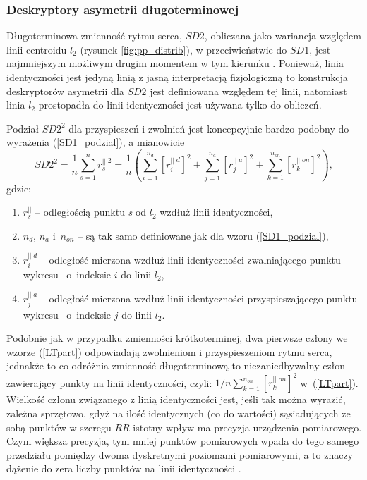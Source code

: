 \subsubsection{Deskryptory asymetrii długoterminowej}

Długoterminowa zmienność rytmu serca, $SD2$, obliczana jako wariancja względem linii
centroidu $l_2$ (rysunek \ref{fig:pp_distrib}), w przeciwieństwie do $SD1$, jest
najmniejszym możliwym drugim momentem w tym kierunku \cite{geomasy,annals,berlinJa}. Ponieważ, linia identyczności jest
jedyną linią z jasną interpretacją fizjologiczną to konstrukcja deskryptorów asymetrii dla
$SD2$ jest definiowana względem tej linii, natomiast linia $l_2$ prostopadła do linii
identyczności jest używana tylko do obliczeń.

Podział $SD2^2$ dla przyspieszeń i zwolnień jest koncepcyjnie bardzo podobny do wyrażenia
(\ref{SD1_podzial}), a mianowicie \cite{annals}
\begin{equation}
SD2^2= \frac{1}{n}\sum_{s=1}^{n}r^{||\;2}_{s}=\frac{1}{n}\left(\sum_{i=1}^{n_{d}}[r^{||\;d}_{i}]^{2}+\sum_{j=1}^{n_{a}}[r^{||\;a}_{j}]^{2}+\sum_{k=1}^{n_{on}}[r^{||\;on}_{k}]^{2}\right), \label{LTpart}
\end{equation}
gdzie:  
\begin{enumerate}
\item[]$r^{||}_{s}$ -- odległością punktu \emph{s} od $l_{2}$ wzdłuż linii identyczności,
\item[]$n_{d}$, $n_{a}$ i~$n_{on}$ -- są tak samo definiowane jak dla wzoru (\ref{SD1_podzial}), 
\item[]$r^{||\;d}_{i}$ -- odległość mierzona wzdłuż linii identyczności zwalniającego punktu  wykresu \PP\ o~indeksie $i$ do linii $l_{2}$,
\item[]$r^{||\;a}_{j}$ -- odległość mierzona wzdłuż linii identyczności przyspieszającego punktu  wykresu \PP\ o~indeksie $j$ do linii $l_{2}$.
\end{enumerate}
Podobnie jak w przypadku zmienności krótkoterminej, dwa pierwsze człony we wzorze (\ref{LTpart})
odpowiadają zwolnieniom i przyspieszeniom rytmu serca, jednakże to co odróżnia zmienność
długoterminową to niezaniedbywalny człon zawierający punkty na linii identyczności, czyli:
$1/n\sum_{k=1}^{n_{on}}[r^{||\;on}_{k}]^{2}$ w~(\ref{LTpart}). Wielkość członu związanego
z linią identyczności jest, jeśli tak można wyrazić, zależna sprzętowo, gdyż na ilość 
identycznych (co do wartości) sąsiadujących ze sobą punktów w szeregu $RR$ istotny wpływ ma
precyzja urządzenia pomiarowego. Czym większa precyzja, tym mniej punktów pomiarowych
wpada do tego samego przedziału pomiędzy dwoma dyskretnymi poziomami pomiarowymi, a to
znaczy dążenie do zera liczby punktów na linii identyczności \cite{annals}. 


